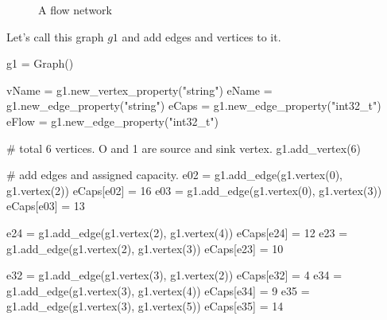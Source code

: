 \documentclass[10pt,a4paper]{article}%
\begin{document}
\begin{figure}[h]
\centering
{}
\caption{\small A flow network}
\label{fig:flow_network}
\end{figure}

\nwenddocs{}Let's call this graph $g1$ and add edges and vertices to it.

\nwenddocs{}\plusendmoddef\nwstartdeflinemarkup\nwenddeflinemarkup
g1 = Graph()

\nwendcode{}\plusendmoddef\nwstartdeflinemarkup\nwenddeflinemarkup
vName = g1.new_vertex_property("string")
eName = g1.new_edge_property("string")
eCaps = g1.new_edge_property("int32_t")
eFlow = g1.new_edge_property("int32_t")
\nwendcode{}\nwdocspar


\nwenddocs{}\plusendmoddef\nwstartdeflinemarkup\nwenddeflinemarkup
# total 6 vertices. O and 1 are source and sink vertex.
g1.add_vertex(6)

# add edges and assigned capacity.
e02 = g1.add_edge(g1.vertex(0), g1.vertex(2))
eCaps[e02] = 16
e03 = g1.add_edge(g1.vertex(0), g1.vertex(3))
eCaps[e03] = 13

e24 = g1.add_edge(g1.vertex(2), g1.vertex(4))
eCaps[e24] = 12
e23 = g1.add_edge(g1.vertex(2), g1.vertex(3))
eCaps[e23] = 10

e32 = g1.add_edge(g1.vertex(3), g1.vertex(2))
eCaps[e32] = 4
e34 = g1.add_edge(g1.vertex(3), g1.vertex(4))
eCaps[e34] = 9
e35 = g1.add_edge(g1.vertex(3), g1.vertex(5))
eCaps[e35] = 14
\end{document}
